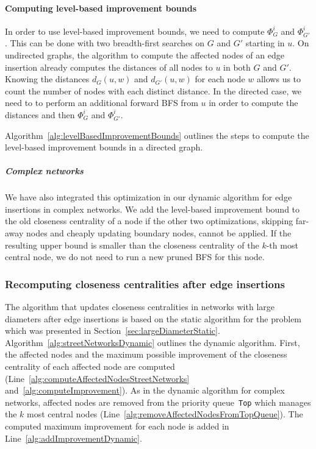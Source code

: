 \paragraph{Computing level-based improvement bounds}
In order to use level-based improvement bounds, we need to compute $\Phi_G^i$ and $\Phi_{G'}^i$. This can be done with two breadth-first searches on $G$ and $G'$ starting in $u$. On undirected graphs, the algorithm to compute the affected nodes of an edge insertion already computes the distances of all nodes to $u$ in both $G$ and $G'$. Knowing the distances $d_G(u, w)$ and $d_{G'}(u, w)$ for each node $w$ allows us to count the number of nodes with each distinct distance. In the directed case, we need to to perform an additional forward BFS from $u$ in order to compute the distances and then $\Phi_G^i$ and $\Phi_{G'}^i$.

Algorithm~\ref{alg:levelBasedImprovementBounds} outlines the steps to compute the level-based improvement bounds in a directed graph.

\subparagraph{Complex networks}
We have also integrated this optimization in our dynamic algorithm for edge insertions in complex networks. We add the level-based improvement bound to the old closeness centrality of a node if the other two optimizations, skipping far-away nodes and cheaply updating boundary nodes, cannot be applied. If the resulting upper bound is smaller than the closeness centrality of the $k$-th most central node, we do not need to run a new pruned BFS for this node.

\subsubsection{Recomputing closeness centralities after edge insertions}
The algorithm that updates closeness centralities in networks with large diameters after edge insertions is based on the static algorithm for the problem which was presented in Section~\ref{sec:largeDiameterStatic}. Algorithm~\ref{alg:streetNetworksDynamic} outlines the dynamic algorithm. First, the affected nodes and the maximum possible improvement of the closeness centrality of each affected node are computed (Line~\ref{alg:computeAffectedNodesStreetNetworks} and~\ref{alg:computeImprovement}). As in the dynamic algorithm for complex networks, affected nodes are removed from the priority queue \texttt{Top} which manages the $k$ most central nodes (Line~\ref{alg:removeAffectedNodesFromTopQueue}). The computed maximum improvement for each node is added in Line~\ref{alg:addImprovementDynamic}.

